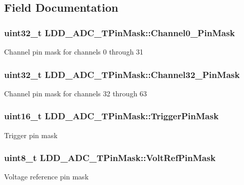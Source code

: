 \subsection{Field Documentation}
\hypertarget{struct_l_d_d___a_d_c___t_pin_mask_a66d94f79f603c74c93540553a49bbf3f}{
\subsubsection[{Channel0\-\_\-31\-Pin\-Mask}]{\setlength{\rightskip}{0pt plus 5cm}uint32\-\_\-t L\-D\-D\-\_\-\-A\-D\-C\-\_\-\-T\-Pin\-Mask\-::\-Channel0\-\_\-Pin\-Mask}}\label{struct_l_d_d___a_d_c___t_pin_mask_a66d94f79f603c74c93540553a49bbf3f}
Channel pin mask for channels 0 through 31 \hypertarget{struct_l_d_d___a_d_c___t_pin_mask_acd6bf6f512fb6e8cd170188dc663a4d8}{
\subsubsection[{Channel32\-\_\-63\-Pin\-Mask}]{\setlength{\rightskip}{0pt plus 5cm}uint32\-\_\-t L\-D\-D\-\_\-\-A\-D\-C\-\_\-\-T\-Pin\-Mask\-::\-Channel32\-\_\-Pin\-Mask}}\label{struct_l_d_d___a_d_c___t_pin_mask_acd6bf6f512fb6e8cd170188dc663a4d8}
Channel pin mask for channels 32 through 63 \hypertarget{struct_l_d_d___a_d_c___t_pin_mask_a004a4d3a4f4071684e6676f64322215f}{
\subsubsection[{Trigger\-Pin\-Mask}]{\setlength{\rightskip}{0pt plus 5cm}uint16\-\_\-t L\-D\-D\-\_\-\-A\-D\-C\-\_\-\-T\-Pin\-Mask\-::\-Trigger\-Pin\-Mask}}\label{struct_l_d_d___a_d_c___t_pin_mask_a004a4d3a4f4071684e6676f64322215f}
Trigger pin mask \hypertarget{struct_l_d_d___a_d_c___t_pin_mask_a556430a91304e7db634bda25091b892c}{
\subsubsection[{Volt\-Ref\-Pin\-Mask}]{\setlength{\rightskip}{0pt plus 5cm}uint8\-\_\-t L\-D\-D\-\_\-\-A\-D\-C\-\_\-\-T\-Pin\-Mask\-::\-Volt\-Ref\-Pin\-Mask}}\label{struct_l_d_d___a_d_c___t_pin_mask_a556430a91304e7db634bda25091b892c}
Voltage reference pin mask 

